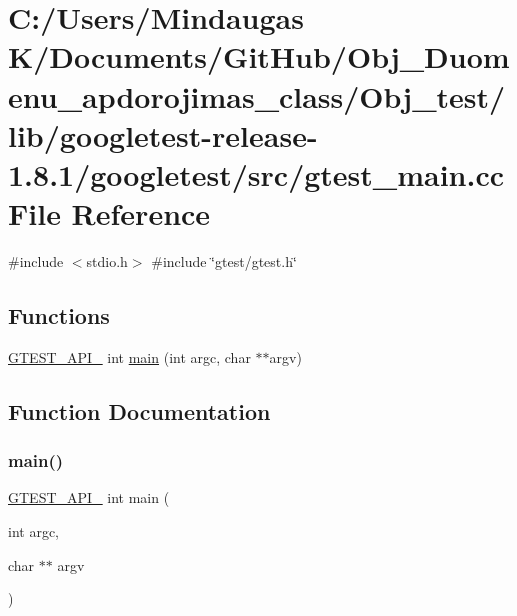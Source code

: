 \hypertarget{_obj__test_2lib_2googletest-release-1_88_81_2googletest_2src_2gtest__main_8cc}{}\section{C\+:/\+Users/\+Mindaugas K/\+Documents/\+Git\+Hub/\+Obj\+\_\+\+Duomenu\+\_\+apdorojimas\+\_\+class/\+Obj\+\_\+test/lib/googletest-\/release-\/1.8.1/googletest/src/gtest\+\_\+main.cc File Reference}
\label{_obj__test_2lib_2googletest-release-1_88_81_2googletest_2src_2gtest__main_8cc}
{\ttfamily \#include $<$stdio.\+h$>$}\newline
{\ttfamily \#include \char`\"{}gtest/gtest.\+h\char`\"{}}\newline
\subsection*{Functions}
\begin{DoxyCompactItemize}
\item 
\mbox{\hyperlink{_obj__test_2lib_2googletest-release-1_88_81_2googletest_2include_2gtest_2internal_2gtest-port_8h_aa73be6f0ba4a7456180a94904ce17790}{G\+T\+E\+S\+T\+\_\+\+A\+P\+I\+\_\+}} int \mbox{\hyperlink{_obj__test_2lib_2googletest-release-1_88_81_2googletest_2src_2gtest__main_8cc_a7f83bdc516d2cb86e20235d94ddf055a}{main}} (int argc, char $\ast$$\ast$argv)
\end{DoxyCompactItemize}


\subsection{Function Documentation}
\mbox{\label{_obj__test_2lib_2googletest-release-1_88_81_2googletest_2src_2gtest__main_8cc_a7f83bdc516d2cb86e20235d94ddf055a}} 
\subsubsection{\texorpdfstring{main()}{main()}}
{\footnotesize\ttfamily \mbox{\hyperlink{_obj__test_2lib_2googletest-release-1_88_81_2googletest_2include_2gtest_2internal_2gtest-port_8h_aa73be6f0ba4a7456180a94904ce17790}{G\+T\+E\+S\+T\+\_\+\+A\+P\+I\+\_\+}} int main (\begin{DoxyParamCaption}\item[{int}]{argc,  }\item[{char $\ast$$\ast$}]{argv }\end{DoxyParamCaption})}

